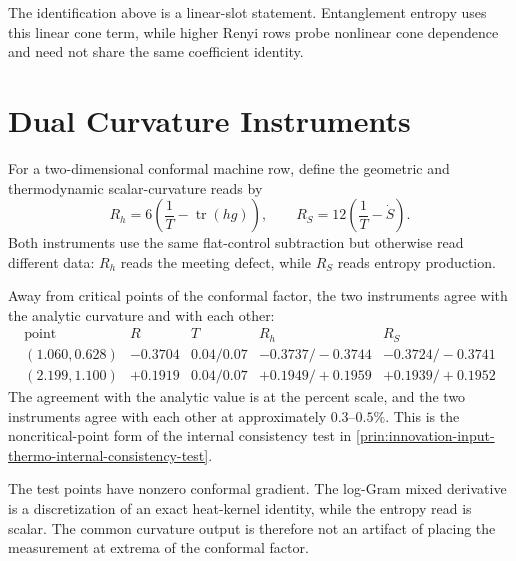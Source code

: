 \begin{remark}
\label{rem:innovation-input-thermo-cone-linearity-scope}
The identification above is a linear-slot statement. Entanglement entropy
uses this linear cone term, while higher Renyi rows probe nonlinear cone
dependence and need not share the same coefficient identity.
\end{remark}

\section{Dual Curvature Instruments}
\label{sec:innovation-input-thermo-verification-dual-instruments}

\begin{definition}
\label{def:innovation-input-thermo-two-curvature-instruments}
For a two-dimensional conformal machine row, define the geometric and
thermodynamic scalar-curvature reads by
$$
R_h
=
6\left(\frac1T-\operatorname{tr}(hg)\right),
\qquad
R_S
=
12\left(\frac1T-\dot S\right).
$$
Both instruments use the same flat-control subtraction but otherwise read
different data: $R_h$ reads the meeting defect, while $R_S$ reads entropy
production.
\end{definition}

\begin{principle}
\label{prin:innovation-input-thermo-generic-point-witness}
Away from critical points of the conformal factor, the two instruments
agree with the analytic curvature and with each other:
$$
\begin{array}{c|c|c|c|c}
\text{point} & R & T & R_h & R_S\\
\hline
(1.060,0.628) & -0.3704 & 0.04/0.07
& -0.3737/-0.3744 & -0.3724/-0.3741\\
(2.199,1.100) & +0.1919 & 0.04/0.07
& +0.1949/+0.1959 & +0.1939/+0.1952
\end{array}
$$
The agreement with the analytic value is at the percent scale, and the two
instruments agree with each other at approximately $0.3$--$0.5\%$. This is
the noncritical-point form of the internal consistency test in
\autoref{prin:innovation-input-thermo-internal-consistency-test}.
\end{principle}

\begin{principle}
\label{prin:innovation-input-thermo-gradient-robustness}
The test points have nonzero conformal gradient. The log-Gram mixed
derivative is a discretization of an exact heat-kernel identity, while the
entropy read is scalar. The common curvature output is therefore not an
artifact of placing the measurement at extrema of the conformal factor.
\end{principle}

